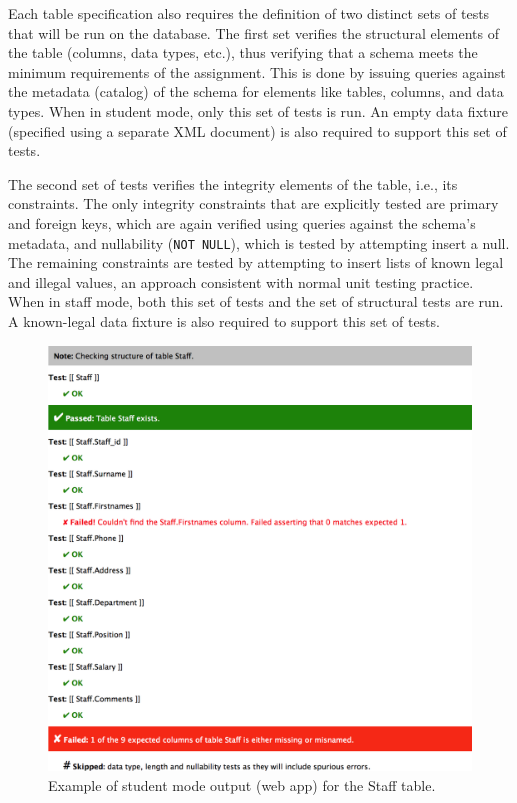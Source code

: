 \documentclass[sigconf, authordraft, capitalise]{acmart}
\begin{document}
Each table specification also requires the definition of two distinct sets of tests that will be run on the database. The first set verifies the structural elements of the table (columns, data types, etc.), thus verifying that a schema meets the minimum requirements of the assignment. This is done by issuing queries against the metadata (catalog) of the schema for elements like tables, columns, and data types. When in student mode, only this set of tests is run. An empty data fixture (specified using a separate XML document) is also required to support this set of tests.

The second set of tests verifies the integrity elements of the table, i.e., its constraints. The only integrity constraints that are explicitly tested are primary and foreign keys, which are again verified using queries against the schema's metadata, and nullability (\texttt{NOT NULL}), which is tested by attempting insert a null. The remaining constraints are tested by attempting to insert lists of known legal and illegal values, an approach consistent with normal unit testing practice. When in staff mode, both this set of tests and the set of structural tests are run. A known-legal data fixture is also required to support this set of tests.


\begin{figure}
    \includegraphics[width=0.95\columnwidth,keepaspectratio]{images/web_output.png}
    \caption{Example of student mode output (web app) for the \textsf{Staff} table.}
    \label{fig-student-output}
\end{figure}
\end{document}
